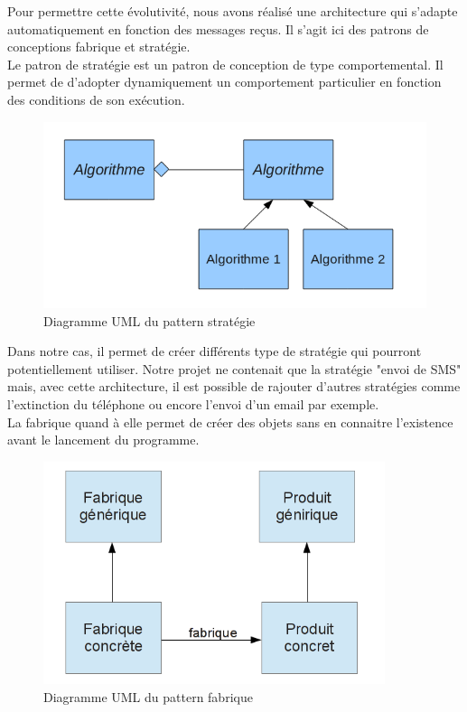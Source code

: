 Pour permettre cette évolutivité, nous avons réalisé une architecture qui s'adapte automatiquement en
fonction des messages reçus. Il s'agit ici des patrons de conceptions fabrique et stratégie. 
\\


Le patron de stratégie est un patron de conception de type comportemental. Il permet de d'adopter 
dynamiquement un comportement particulier en fonction des conditions de son exécution.

\begin{figure}[H]
	\center
	\includegraphics[width=12cm]{img/pattern-strategie.png}
	\caption{Diagramme UML du pattern stratégie}
\end{figure}

Dans notre cas, il permet de créer différents type de stratégie qui pourront potentiellement utiliser. 
Notre projet ne contenait que la stratégie "envoi de SMS" mais, avec cette architecture, il est possible 
de rajouter d'autres stratégies comme l'extinction du téléphone ou encore l'envoi d'un email par exemple.
\\


La fabrique quand à elle permet de créer des objets sans en connaitre l'existence avant le lancement du 
programme.

\begin{figure}[H]
	\center
	\includegraphics[width=10cm]{img/fabrique.png}
	\caption{Diagramme UML du pattern fabrique}
\end{figure}

